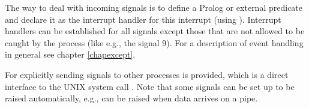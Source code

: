 The way to deal with incoming signals is to define a Prolog or external
predicate and declare it as the interrupt handler for this interrupt
(using
).
Interrupt handlers can be established for all signals except those that are
not allowed to be caught by the process (like e.g., the  signal
9).
For a description of event handling in general see chapter \ref{chapexcept}.

For explicitly sending signals to other processes
 is provided,
which is a direct interface to the UNIX system call .
Note that some signals can be set up to be raised automatically,
e.g.,  can be raised when data arrives on a pipe.


